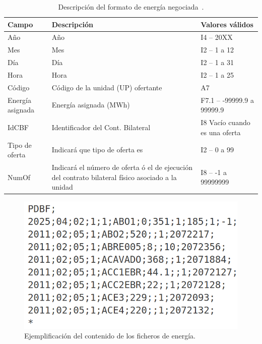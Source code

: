 \begin{table}[ht]
  \centering
  \begin{tabular}{|l|p{5cm}|l|}
    \hline
    Campo             & Descripción                                                                                       & Valores válidos               \\
    \hline
    Año               & Año                                                                                               & I4 -- 20XX                    \\
    Mes               & Mes                                                                                               & I2 -- 1 a 12                  \\
    Día               & Día                                                                                               & I2 -- 1 a 31                  \\
    Hora              & Hora                                                                                              & I2 -- 1 a 25                  \\
    Código            & Código de la unidad (UP) ofertante                                                                & A7                            \\
    Energía asignada  & Energía asignada (MWh)                                                                            & F7.1 -- -99999.9 a 99999.9     \\
    IdCBF             & Identificador del Cont. Bilateral                                                                 & I8 Vacío cuando es una oferta \\
    Tipo de oferta    & Indicará que tipo de oferta es                                                                    & I2 -- 0 a 99                   \\
    NumOf             & Indicará el número de oferta ó el de ejecución del contrato bilateral físico asociado a la unidad & I8 -- -1 a 99999999            \\
    \hline
  \end{tabular}
  \caption[Descripción del formato de energía negociada.]{Descripción del formato de energía negociada~\cite{omie2025modelo}.}
  \label{tab:descripción-energia}
\end{table}

\begin{figure}
  \centering
  \includegraphics[width=0.5\linewidth]{figures/contenido-energia.png}
  \caption[Ejemplificación del contenido de los ficheros de energía.]{Ejemplificación del contenido de los ficheros de energía.}
  \label{fig:contenido-energia}
\end{figure}

